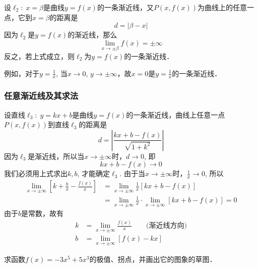 设$\ell_2:\; x=\beta$是曲线$y=f(x)$的一条渐近线，又$P(x,f(x))$为曲线上的任意一点，它到$x=\beta$的距离是
\[d=|\beta-x|\]
因为$\ell_2$是$y=f(x)$的渐近线，那么
\[\lim_{x\to\pm\beta} f (x) =\pm\infty\]
反之，若上式成立，则$\ell_2$为$y=f(x)$的一条渐近线．

例如，对于$y=\frac{1}{x}$, 当$x\to 0$, $y\to \pm\infty$，故$x=0$是$y=\frac{1}{x}$的一条渐近线．

\subsubsection{任意渐近线及其求法}

设直线$\ell_3:\; y=kx+b$是曲线$y=f(x)$的一条渐近线，曲线上任意一点$P(x,f(x))$到直线$\ell_3$的距离是
\[d=\left|\frac{kx+b-f(x)}{\sqrt{1+k^2}}\right|\]
因为$\ell_3$是渐近线，所以当$x\to\pm\infty$时，$d\to 0$, 即
\[kx+b-f (x) \to 0\]
我们必须用上式求出$k,b$, 才能确定$\ell_3$. 由于当$x\to\pm\infty$时，$\frac{1}{x}\to 0$, 所以
\begin{align*}
\lim_{x\to\pm\infty}\left[k+\frac{b}{x}-\frac{f(x)}{x}\right]&=\lim_{x\to\pm\infty}\frac{1}{x}[kx+b-f(x)]\\
&=\lim_{x\to\pm\infty}\frac{1}{x}\cdot \lim_{x\to\pm\infty}[kx+b-f(x)]=0
\end{align*}
由于$b$是常数，故有
\begin{align}
    k&=\lim_{x\to\pm\infty}\frac{f(x)}{x}\qquad \text{(渐近线方向)}\\
b&=\lim_{x\to\pm\infty}[f(x)-kx]
\end{align}

\begin{example}
求函数$f(x)=-3x^5+5x^3$的极值、拐点，并画出它的图象的草图．
\end{example}

